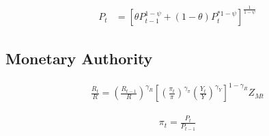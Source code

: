 \documentclass[
	12pt,
	]{article}
\numberwithin{equation}{section}
\DeclareMathOperator{\dif}{d}
\theoremstyle{definition}
\theoremstyle{plain}
\theoremstyle{plain}
\theoremstyle{plain}
\begin{document}
\begin{align}
	P_t & = \left[ \theta P_{t-1}^{1-\psi} + (1-\theta) P_t^{\ast 1-\psi} \right]^\frac{1}{1-\psi} \label{eq:general-price-level}
\end{align}



\subsection{Monetary Authority}

\begin{align}
	\label{eq:monetary-policy}
	\frac{R_t}{R} =
	\left( \frac{R_{t-1}}{R} \right)^{\gamma_R}  \left[
	\left( \frac{\pi_{t}}{\pi} \right)^{\gamma_\pi}
	\left( \frac{Y_t}{Y} \right)^{\gamma_Y} \right]^{1-\gamma_R} Z_{Mt}
\end{align}

\begin{align}
	\pi_t = \frac{P_t}{P_{t-1}}
	\label{eq:gross-inflation-rate}
\end{align}


\end{document}
